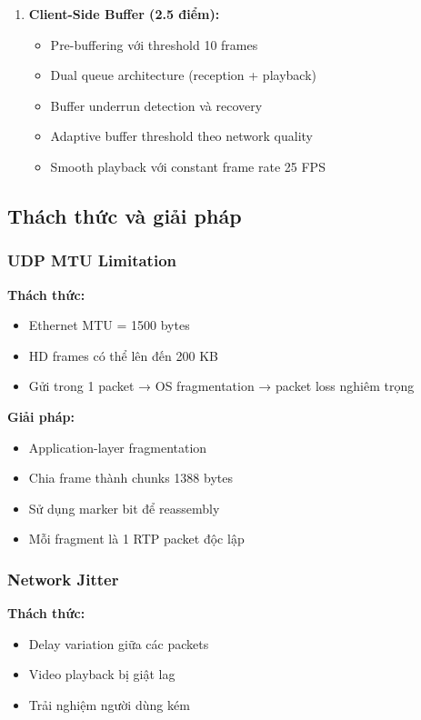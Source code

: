 \begin{enumerate}
    \item \textbf{Client-Side Buffer (2.5 điểm):}
    \begin{itemize}
        \item Pre-buffering với threshold 10 frames
        \item Dual queue architecture (reception + playback)
        \item Buffer underrun detection và recovery
        \item Adaptive buffer threshold theo network quality
        \item Smooth playback với constant frame rate 25 FPS
    \end{itemize}
\end{enumerate}

\subsection{Thách thức và giải pháp}

\subsubsection{UDP MTU Limitation}

\textbf{Thách thức:}
\begin{itemize}
    \item Ethernet MTU = 1500 bytes
    \item HD frames có thể lên đến 200 KB
    \item Gửi trong 1 packet → OS fragmentation → packet loss nghiêm trọng
\end{itemize}

\textbf{Giải pháp:}
\begin{itemize}
    \item Application-layer fragmentation
    \item Chia frame thành chunks 1388 bytes
    \item Sử dụng marker bit để reassembly
    \item Mỗi fragment là 1 RTP packet độc lập
\end{itemize}

\subsubsection{Network Jitter}

\textbf{Thách thức:}
\begin{itemize}
    \item Delay variation giữa các packets
    \item Video playback bị giật lag
    \item Trải nghiệm người dùng kém
\end{itemize}

